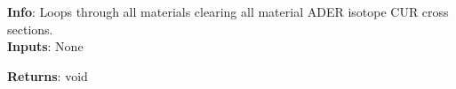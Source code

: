 \textbf{Info}: Loops through all materials clearing all material ADER isotope
CUR cross sections. \\

\noindent \textbf{Inputs}: None

\noindent \textbf{Returns}: void
